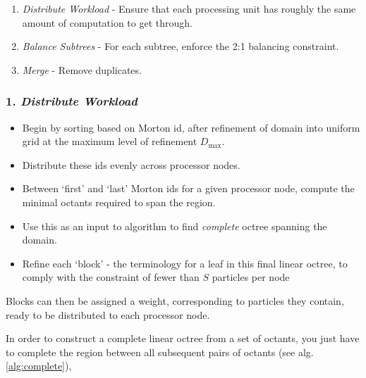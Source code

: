 \documentclass[12pt, a4, twoside]{article}
\begin{document}
\begin{enumerate}
    \item \textit{Distribute Workload} - Ensure that each processing unit has roughly the same amount of computation to get through.
    \item \textit{Balance Subtrees} - For each subtree, enforce the 2:1 balancing constraint.
    \item \textit{Merge} - Remove duplicates.
\end{enumerate}

\subsubsection*{1. \textit{Distribute Workload}}

\begin{itemize}
    \item Begin by sorting based on Morton id, after refinement of domain into uniform grid at the maximum level of refinement $D_{\max}$.
    \item Distribute these ids evenly across processor nodes.
    \item Between `first' and `last' Morton ids for a given processor node, compute the minimal octants required to span the region.
    \item Use this as an input to algorithm to find \textit{complete} octree spanning the domain.
    \item Refine each `block' - the terminology for a leaf in this final linear octree, to comply with the constraint of fewer than $S$ particles per node
\end{itemize}

Blocks can then be assigned a weight, corresponding to particles they contain, ready to be distributed to each processor node.


In order to construct a complete linear octree from a set of octants, you just have to complete the region between all subsequent pairs of octants (see alg. \ref{alg:complete}),
\end{document}
